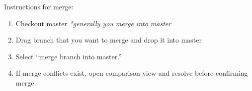 \documentclass[12pt]{article}
\begin{document}
Instructions for merge:
\begin{enumerate}
  \item Checkout master \emph{*generally you merge into master}
  \item Drag branch that you want to merge and drop it into master
  \item Select ``merge branch into master.''
  \item If merge conflicts exist, open comparison view and resolve before confirming merge.
\end{enumerate}
\end{document}
